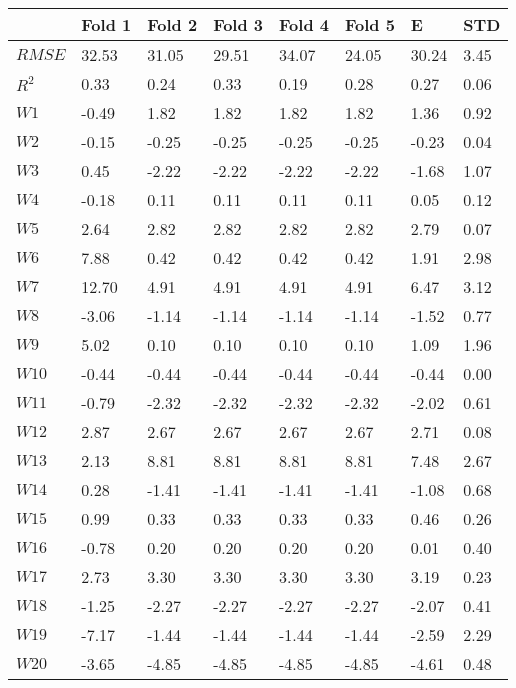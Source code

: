 \documentclass{article}
\begin{document}
\begin{longtable}{llllllll}
    \toprule
            &	Fold 1  &   Fold 2 & Fold 3  & Fold 4 & Fold 5   & E & STD   \\
    \midrule
    $RMSE$  &   32.53 & 31.05 & 29.51 & 34.07 & 24.05 & 30.24 & 3.45 \\
    $R^2$   &   0.33  & 0.24  & 0.33  & 0.19  & 0.28  & 0.27  & 0.06 \\
    $W1$ &   -0.49 & 1.82  & 1.82  & 1.82  & 1.82  & 1.36  & 0.92 \\
    $W2$ &   -0.15 & -0.25 & -0.25 & -0.25 & -0.25 & -0.23 & 0.04 \\
    $W3$ &   0.45  & -2.22 & -2.22 & -2.22 & -2.22 & -1.68 & 1.07 \\
    $W4$ &   -0.18 & 0.11  & 0.11  & 0.11  & 0.11  & 0.05  & 0.12 \\
    $W5$ &   2.64  & 2.82  & 2.82  & 2.82  & 2.82  & 2.79  & 0.07 \\
    $W6$ &   7.88  & 0.42  & 0.42  & 0.42  & 0.42  & 1.91  & 2.98 \\
    $W7$ &   12.70 & 4.91  & 4.91  & 4.91  & 4.91  & 6.47  & 3.12 \\
    $W8$ &   -3.06 & -1.14 & -1.14 & -1.14 & -1.14 & -1.52 & 0.77 \\
    $W9$ &   5.02  & 0.10  & 0.10  & 0.10  & 0.10  & 1.09  & 1.96 \\
    $W10$ &   -0.44 & -0.44 & -0.44 & -0.44 & -0.44 & -0.44 & 0.00 \\
    $W11$ &   -0.79 & -2.32 & -2.32 & -2.32 & -2.32 & -2.02 & 0.61 \\
    $W12$ &   2.87  & 2.67  & 2.67  & 2.67  & 2.67  & 2.71  & 0.08 \\
    $W13$ &   2.13  & 8.81  & 8.81  & 8.81  & 8.81  & 7.48  & 2.67 \\
    $W14$ &   0.28  & -1.41 & -1.41 & -1.41 & -1.41 & -1.08 & 0.68 \\
    $W15$ &   0.99  & 0.33  & 0.33  & 0.33  & 0.33  & 0.46  & 0.26 \\
    $W16$ &   -0.78 & 0.20  & 0.20  & 0.20  & 0.20  & 0.01  & 0.40 \\
    $W17$ &   2.73  & 3.30  & 3.30  & 3.30  & 3.30  & 3.19  & 0.23 \\
    $W18$ &   -1.25 & -2.27 & -2.27 & -2.27 & -2.27 & -2.07 & 0.41 \\
    $W19$ &   -7.17 & -1.44 & -1.44 & -1.44 & -1.44 & -2.59 & 2.29 \\
    $W20$ &   -3.65 & -4.85 & -4.85 & -4.85 & -4.85 & -4.61 & 0.48 \\

\end{longtable}
\end{document}
